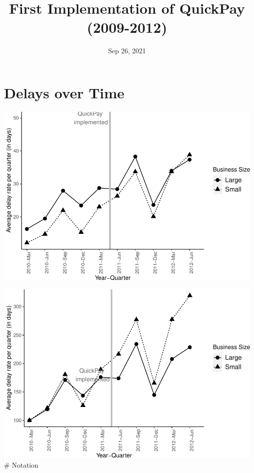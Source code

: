 \documentclass[
]{article}
\title{First Implementation of QuickPay (2009-2012)}
\author{}
\date{\vspace{-2.5em}Sep 26, 2021}
\begin{document}
\maketitle

\hypertarget{delays-over-time}{%
\section{Delays over Time}\label{delays-over-time}}

\includegraphics{qp_first_implementation_files/figure-latex/plot-1.pdf}

\includegraphics{qp_first_implementation_files/figure-latex/normalized_plot-1.pdf}
\# Notation
\end{document}
